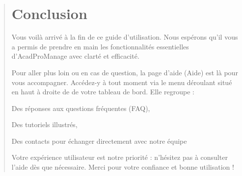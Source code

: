 \documentclass[a4paper,12pt]{article}
\begin{document}
\begin{quote}
\newpage
\section*{Conclusion}

Vous voilà arrivé à la fin de ce guide d’utilisation. Nous espérons qu’il vous a permis de prendre en main les fonctionnalités essentielles d’AcadProManage avec clarté et efficacité.

Pour aller plus loin ou en cas de question, la page d’aide (Aide) est là pour vous accompagner. Accédez-y à tout moment via le menu déroulant situé en haut à droite de de votre tableau de bord. Elle regroupe :

Des réponses aux questions fréquentes (FAQ),

Des tutoriels illustrés,

Des contacts pour échanger directement avec notre équipe

Votre expérience utilisateur est notre priorité : n’hésitez pas à consulter l’aide dès que nécessaire. Merci pour votre confiance et bonne utilisation !
\end{quote}
\end{document}
